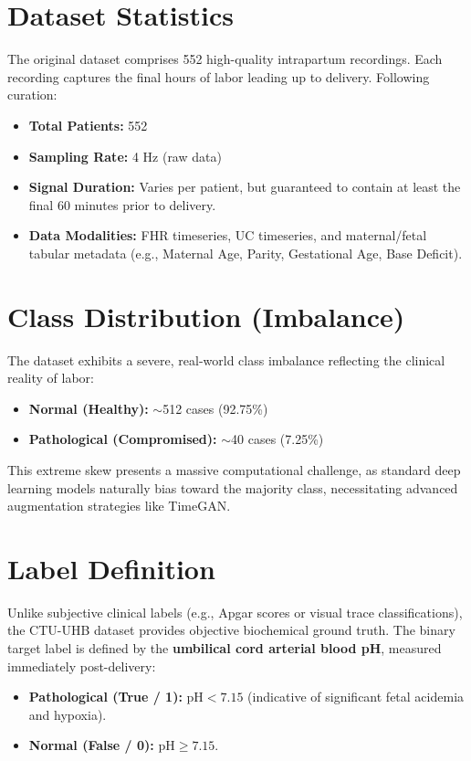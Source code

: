 \documentclass[12pt,a4paper]{report}
\begin{document}
\section{Dataset Statistics}
The original dataset comprises 552 high-quality intrapartum recordings. Each recording captures the final hours of labor leading up to delivery. Following curation:
\begin{itemize}
    \item \textbf{Total Patients:} 552
    \item \textbf{Sampling Rate:} 4 Hz (raw data)
    \item \textbf{Signal Duration:} Varies per patient, but guaranteed to contain at least the final 60 minutes prior to delivery.
    \item \textbf{Data Modalities:} FHR timeseries, UC timeseries, and maternal/fetal tabular metadata (e.g., Maternal Age, Parity, Gestational Age, Base Deficit).
\end{itemize}

\section{Class Distribution (Imbalance)}
The dataset exhibits a severe, real-world class imbalance reflecting the clinical reality of labor:
\begin{itemize}
    \item \textbf{Normal (Healthy):} $\sim$512 cases (92.75\%)
    \item \textbf{Pathological (Compromised):} $\sim$40 cases (7.25\%)
\end{itemize}
This extreme skew presents a massive computational challenge, as standard deep learning models naturally bias toward the majority class, necessitating advanced augmentation strategies like TimeGAN.

\section{Label Definition}
Unlike subjective clinical labels (e.g., Apgar scores or visual trace classifications), the CTU-UHB dataset provides objective biochemical ground truth. The binary target label is defined by the \textbf{umbilical cord arterial blood pH}, measured immediately post-delivery:
\begin{itemize}
    \item \textbf{Pathological (True / 1):} $\text{pH} < 7.15$ (indicative of significant fetal acidemia and hypoxia).
    \item \textbf{Normal (False / 0):} $\text{pH} \geq 7.15$.
\end{itemize}
\end{document}

